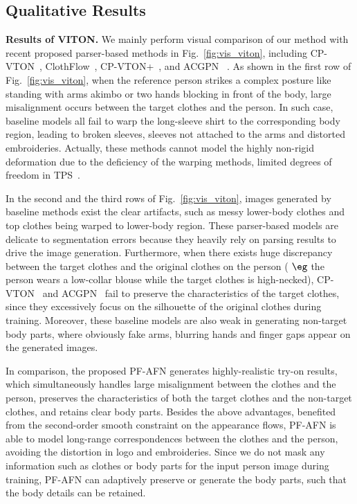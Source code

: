 \documentclass[final]{cvpr}
\begin{document}
	\subsection{Qualitative Results}
	\textbf{Results of VITON.} 
We mainly perform visual comparison of our method with recent proposed parser-based methods in Fig.~\ref{fig:vis_viton}, including CP-VTON~\cite{cpvton}, ClothFlow~\cite{clothflow}, CP-VTON+~\cite{cpvton_plus}, and ACGPN~\cite{ACGPN} .
As shown in the first row of Fig.~\ref{fig:vis_viton}, 
when the reference person strikes a complex posture like standing with arms akimbo or two hands blocking in front of the body, large misalignment occurs between the target clothes and the person.
In such case, baseline models all fail to warp the long-sleeve shirt to the corresponding body region, leading to broken sleeves, sleeves not attached to the arms and distorted embroideries.
Actually, these methods cannot model the highly non-rigid deformation due to the deficiency of the warping methods, \ie limited degrees of freedom in TPS~\cite{tps}. 
	
	
	In the second and the third rows of Fig.~\ref{fig:vis_viton}, images generated by baseline methods exist the clear artifacts, such as messy lower-body clothes and top clothes being warped to lower-body region.
These parser-based models are delicate to segmentation errors because they heavily rely on parsing results to drive the image generation.
Furthermore, when there exists huge discrepancy between the target clothes and the original clothes on the person ( $\eg$ the person wears a low-collar blouse while the target clothes is high-necked), CP-VTON~\cite{cpvton} and ACGPN~\cite{ACGPN} fail to preserve the characteristics of the target clothes, since they excessively focus on the silhouette of the original clothes during training.
Moreover, these baseline models are also weak in generating non-target body parts, where obviously fake arms, blurring hands and finger gaps appear on the generated images.
	
In comparison, the proposed PF-AFN generates highly-realistic try-on results, which simultaneously handles large misalignment between the clothes and the person, preserves the characteristics of both the target clothes and the non-target clothes, and retains clear body parts.
Besides the above advantages, benefited from the second-order smooth constraint on the appearance flows, PF-AFN is able to model long-range correspondences between the clothes and the person, avoiding the distortion in logo and embroideries.
Since we do not mask any information such as clothes or body parts for the input person image during training, PF-AFN can adaptively preserve or generate the body parts, such that the body details can be retained.
	
\end{document}
